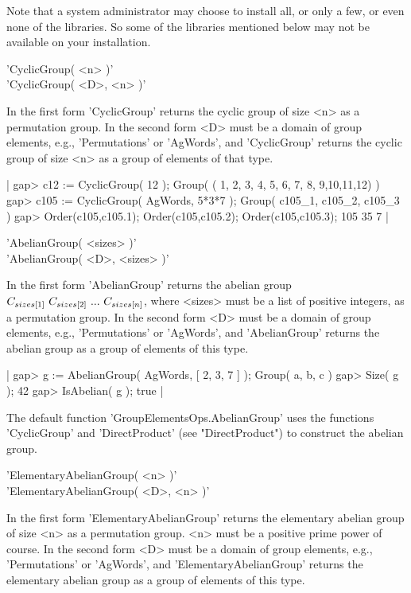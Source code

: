 Note  that  a system administrator may  choose  to install  all, or  only
a few, or even none of the libraries.  So some of the libraries mentioned
below may not be available on your installation.


'CyclicGroup( <n> )'%
 \\
'CyclicGroup( <D>, <n> )'

In the first form 'CyclicGroup' returns the cyclic group of size <n> as a
permutation group.   In the second form   <D> must be   a domain of group
elements,  e.g., 'Permutations' or  'AgWords', and 'CyclicGroup'  returns
the cyclic group of size <n> as a group of elements of that type.

|    gap> c12 := CyclicGroup( 12 );
    Group( ( 1, 2, 3, 4, 5, 6, 7, 8, 9,10,11,12) )
    gap> c105 := CyclicGroup( AgWords, 5*3*7 );
    Group( c105_1, c105_2, c105_3 )
    gap> Order(c105,c105.1); Order(c105,c105.2); Order(c105,c105.3);
    105
    35
    7 |

\vspace{5mm}
'AbelianGroup( <sizes> )'%
 \\
'AbelianGroup( <D>, <sizes> )'

In the first form  'AbelianGroup' returns the abelian group $C_{sizes[1]}
\*\ C_{sizes[2]} \*\ ... \*\ C_{sizes[n]}$, where <sizes>  must be a list
of  positive  integers, as a permutation  group.  In the  second form <D>
must  be a  domain of group elements,  e.g., 'Permutations' or 'AgWords',
and  'AbelianGroup' returns the  abelian group as a  group of elements of
this type.

|    gap> g := AbelianGroup( AgWords, [ 2, 3, 7 ] );
    Group( a, b, c )
    gap> Size( g );
    42
    gap> IsAbelian( g );
    true |

The default function 'GroupElementsOps.AbelianGroup' uses  the  functions
'CyclicGroup' and 'DirectProduct' (see "DirectProduct")  to construct the
abelian group.

\vspace{5mm}
'ElementaryAbelianGroup( <n> )'%
 \\
'ElementaryAbelianGroup( <D>, <n> )'

In the first form 'ElementaryAbelianGroup' returns the elementary abelian
group of size <n> as a  permutation group.  <n>  must be a positive prime
power of course.   In the  second form <D>  must be  a  domain of   group
elements, e.g., 'Permutations' or 'AgWords', and 'ElementaryAbelianGroup'
returns the elementary abelian group as a group of elements of this type.

